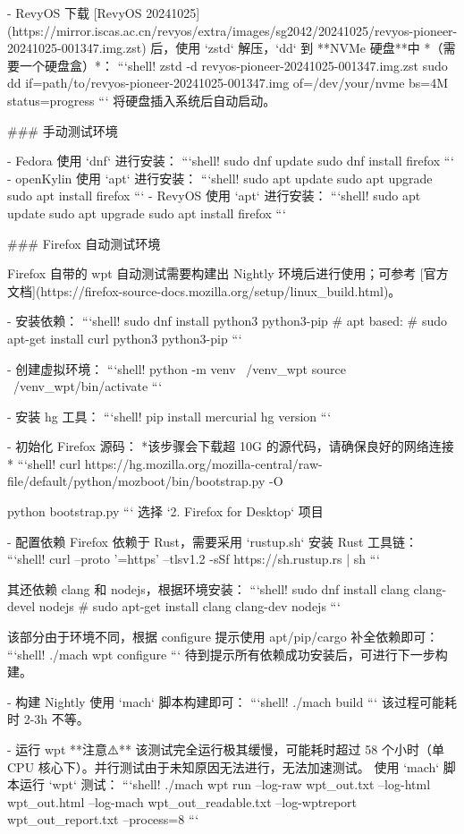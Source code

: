 \documentclass{article}
\begin{document}
\begin{markdown}
- RevyOS
下载 [RevyOS 20241025](https://mirror.iscas.ac.cn/revyos/extra/images/sg2042/20241025/revyos-pioneer-20241025-001347.img.zst) 后，使用 `zstd` 解压，`dd` 到 **NVMe 硬盘**中 *（需要一个硬盘盒）*：
```shell!
zstd -d revyos-pioneer-20241025-001347.img.zst
sudo dd if=path/to/revyos-pioneer-20241025-001347.img of=/dev/your/nvme bs=4M status=progress
```
将硬盘插入系统后自动启动。

### 手动测试环境

- Fedora
使用 `dnf` 进行安装：
```shell!
sudo dnf update
sudo dnf install firefox
```
- openKylin
使用 `apt` 进行安装：
```shell!
sudo apt update
sudo apt upgrade
sudo apt install firefox
```
- RevyOS
使用 `apt` 进行安装：
```shell!
sudo apt update
sudo apt upgrade
sudo apt install firefox
```

### Firefox 自动测试环境

Firefox 自带的 wpt 自动测试需要构建出 Nightly 环境后进行使用；可参考 [官方文档](https://firefox-source-docs.mozilla.org/setup/linux_build.html)。

- 安装依赖：
```shell!
sudo dnf install python3 python3-pip
# apt based:
# sudo apt-get install curl python3 python3-pip
```

- 创建虚拟环境：
```shell!
python -m venv ~/venv_wpt
source ~/venv_wpt/bin/activate
```

- 安装 hg 工具：
```shell!
pip install mercurial
hg version
```

- 初始化 Firefox 源码：
*该步骤会下载超 10G 的源代码，请确保良好的网络连接*
```shell!
curl https://hg.mozilla.org/mozilla-central/raw-file/default/python/mozboot/bin/bootstrap.py -O

python bootstrap.py
```
选择 `2. Firefox for Desktop` 项目

- 配置依赖
Firefox 依赖于 Rust，需要采用 `rustup.sh` 安装 Rust 工具链：
```shell!
curl --proto '=https' --tlsv1.2 -sSf https://sh.rustup.rs | sh
```

其还依赖 clang 和 nodejs，根据环境安装：
```shell!
sudo dnf install clang clang-devel nodejs
# sudo apt-get install clang clang-dev nodejs
```

该部分由于环境不同，根据 configure 提示使用 apt/pip/cargo 补全依赖即可：
```shell!
./mach wpt configure
```
待到提示所有依赖成功安装后，可进行下一步构建。

- 构建 Nightly
使用 `mach` 脚本构建即可：
```shell!
./mach build
```
该过程可能耗时 2-3h 不等。

- 运行 wpt
**注意⚠️** 该测试完全运行极其缓慢，可能耗时超过 58 个小时（单 CPU 核心下）。并行测试由于未知原因无法进行，无法加速测试。
使用 `mach` 脚本运行 `wpt` 测试：
```shell!
./mach wpt run --log-raw wpt_out.txt --log-html wpt_out.html --log-mach wpt_out_readable.txt --log-wptreport wpt_out_report.txt --process=8
```


\end{markdown}
\end{document}

